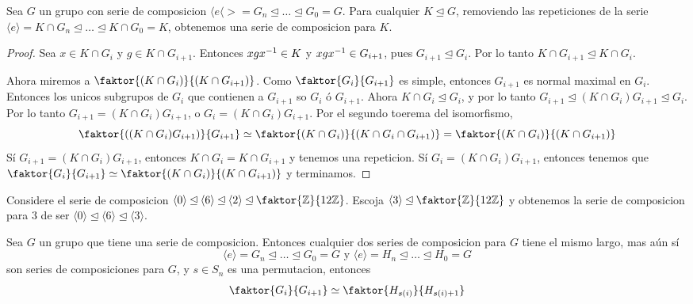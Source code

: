 \begin{lemma}\label{10.44}
    Sea $G$ un grupo con serie de composicion  $\langle e \langle>=G_n \unlhd
    \dots \unlhd G_0=G$. Para cualquier $K \unlhd G$, removiendo las
    repeticiones de la serie  $\langle e \rangle=K \cap G_n \unlhd \dots \unlhd
    K \cap G_0=K$, obtenemos una serie de composicion para $K$.
\end{lemma}
\begin{proof}
    Sea $x \in K \cap G_i$ y  $g \in K \cap G_{i+1}$. Entonces $xgx^{-1} \in K$
    y $xgx^{-1} \in G_{i+1}$, pues $G_{i+1} \unlhd G_i$. Por lo tanto $K \cap
    G_{i+1} \unlhd K \cap G_i$.

    Ahora miremos a $\faktor{(K \cap G_i)}{(K \cap G_{i+1})}$. Como
    $\faktor{G_i}{G_{i+1}}$ es simple, entonces $G_{i+1}$ es normal maximal en
    $G_i$. Entonces los unicos subgrupos de  $G_i$ que contienen a  $G_{i+1}$ so
    $G_i$ \'o  $G_{i+1}$. Ahora $K \cap G_i \unlhd G_i$, y por lo tanto
    $G_{i+1} \unlhd (K \cap G_i)G_{i+1} \unlhd G_i$. Por lo tanto $G_{i+1}=(K
    \cap G_i)G_{i+1}$, o $G_i=(K \cap G_i)G_{i+1}$. Por el segundo toerema del
    isomorfismo,
    \begin{equation*}
        \faktor{((K \cap G_i)G_{i+1})}{G_{i+1}} \simeq \faktor{(K \cap G_i)}{(K
        \cap G_i \cap G_{i+1})}=\faktor{(K \cap G_i)}{(K \cap G_{i+1})}
    \end{equation*}
    S\'i $G_{i+1}=(K \cap G_i)G_{i+1}$, entonces  $K \cap G_i=K \cap G_{i+1}$ y
    tenemos una repeticion. S\'i $G_i=(K \cap G_i)G_{i+1}$, entonces tenemos que
    $\faktor{G_i}{G_{i+1}} \simeq \faktor{(K \cap G_i)}{(K \cap G_{i+1})}$ y
    terminamos.
\end{proof}

\begin{example}\label{}
    Considere el serie de composicion $\langle 0 \rangle \unlhd \langle 6
    \rangle \unlhd \langle 2 \rangle \unlhd \faktor{\Z}{12\Z}$. Escoja $\langle
    3 \rangle \unlhd \faktor{\Z}{12\Z}$ y obtenemos la serie de composicion para
    $3$ de ser  $\langle 0 \rangle \unlhd \langle 6 \rangle \unlhd \langle 3
    \rangle$.
\end{example}

\begin{theorem}\label{10.45}
    Sea $G$ un grupo que tiene una serie de composicion. Entonces cualquier dos
    series de composicion para $G$ tiene el mismo largo, mas a\'un s\'i
    \begin{equation*}
        \langle e \rangle=G_n \unlhd \dots \unlhd G_0=G \text{ y }
        \langle e \rangle=H_n \unlhd \dots \unlhd H_0=G
    \end{equation*}
    son series de composiciones para $G$, y  $s \in S_n$ es una permutacion,
    entonces
    \begin{equation*}
        \faktor{G_i}{G_{i+1}} \simeq \faktor{H_{s(i)}}{H_{s(i)+1}}
    \end{equation*}
\end{theorem}

